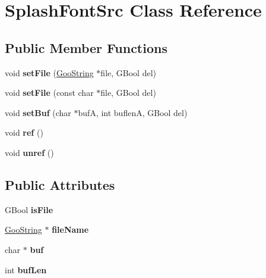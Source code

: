 \hypertarget{class_splash_font_src}{}\section{Splash\+Font\+Src Class Reference}
\label{class_splash_font_src}
\subsection*{Public Member Functions}
\begin{DoxyCompactItemize}
\item 
\mbox{\label{class_splash_font_src_a696b0f102668a75fed8a31d2f9129dfd}} 
void {\bfseries set\+File} (\hyperlink{class_goo_string}{Goo\+String} $\ast$file, G\+Bool del)
\item 
\mbox{\label{class_splash_font_src_a7c685e6a8525406434e87b161e894257}} 
void {\bfseries set\+File} (const char $\ast$file, G\+Bool del)
\item 
\mbox{\label{class_splash_font_src_acaafe03578c9f70e7ef1e46c9c77e91f}} 
void {\bfseries set\+Buf} (char $\ast$bufA, int buflenA, G\+Bool del)
\item 
\mbox{\label{class_splash_font_src_ae89455a28b7e52deb7e5c294e6047bd5}} 
void {\bfseries ref} ()
\item 
\mbox{\label{class_splash_font_src_afe35f037af3697d3ccd60aec05438fb3}} 
void {\bfseries unref} ()
\end{DoxyCompactItemize}
\subsection*{Public Attributes}
\begin{DoxyCompactItemize}
\item 
\mbox{\label{class_splash_font_src_af5b053d51eb9ca603f396da1e1c0d5d6}} 
G\+Bool {\bfseries is\+File}
\item 
\mbox{\label{class_splash_font_src_a0d52aa113c8e689ef4d8c3b7791b3988}} 
\hyperlink{class_goo_string}{Goo\+String} $\ast$ {\bfseries file\+Name}
\item 
\mbox{\label{class_splash_font_src_abec03e3f31386395264d95d77a6987fc}} 
char $\ast$ {\bfseries buf}
\item 
\mbox{\label{class_splash_font_src_a14f798d0a15af593140abbc3a4d5597c}} 
int {\bfseries buf\+Len}
\end{DoxyCompactItemize}


